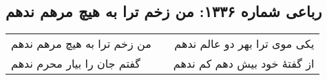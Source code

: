 \begin{center}
\section*{رباعی شماره ۱۳۳۶: من زخم ترا به هیچ مرهم ندهم}
\label{sec:1336}
\begin{longtable}{l p{0.5cm} r}
من زخم ترا به هیچ مرهم ندهم
&&
یکی موی ترا بهر دو عالم ندهم
\\
گفتم جان را بیار محرم ندهم
&&
از گفتهٔ خود بیش دهم کم ندهم
\\
\end{longtable}
\end{center}
